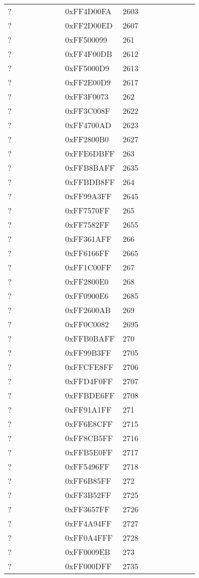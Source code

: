 \begin{longtable}{p{0.3\linewidth} p{0.3\linewidth} p{0.4\linewidth}}
? &  0xFF4D00FA &  2603\\
? &  0xFF2D00ED &  2607\\
? &  0xFF500099 &  261\\
? &  0xFF4F00DB &  2612\\
? &  0xFF5000D9 &  2613\\
? &  0xFF2E00D9 &  2617\\
? &  0xFF3F0073 &  262\\
? &  0xFF3C008F &  2622\\
? &  0xFF4700AD &  2623\\
? &  0xFF2800B0 &  2627\\
? &  0xFFE6DBFF &  263\\
? &  0xFFB8BAFF &  2635\\
? &  0xFFBDB8FF &  264\\
? &  0xFF99A3FF &  2645\\
? &  0xFF7570FF &  265\\
? &  0xFF7582FF &  2655\\
? &  0xFF361AFF &  266\\
? &  0xFF6166FF &  2665\\
? &  0xFF1C00FF &  267\\
? &  0xFF2800E0 &  268\\
? &  0xFF0900E6 &  2685\\
? &  0xFF2600AB &  269\\
? &  0xFF0C0082 &  2695\\
? &  0xFFB0BAFF &  270\\
? &  0xFF99B3FF &  2705\\
? &  0xFFCFE8FF &  2706\\
? &  0xFFD4F0FF &  2707\\
? &  0xFFBDE6FF &  2708\\
? &  0xFF91A1FF &  271\\
? &  0xFF6E8CFF &  2715\\
? &  0xFF8CB5FF &  2716\\
? &  0xFFB5E0FF &  2717\\
? &  0xFF5496FF &  2718\\
? &  0xFF6B85FF &  272\\
? &  0xFF3B52FF &  2725\\
? &  0xFF3657FF &  2726\\
? &  0xFF4A94FF &  2727\\
? &  0xFF0A4FFF &  2728\\
? &  0xFF0009EB &  273\\
? &  0xFF000DFF &  2735\\

\end{longtable}
